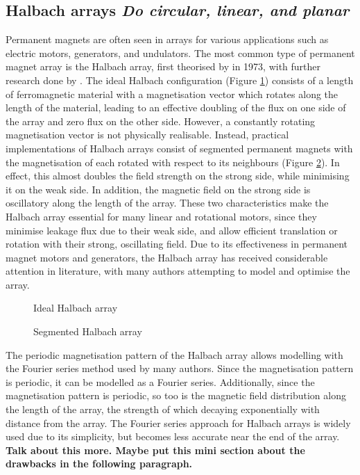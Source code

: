 \subsection{Halbach arrays \textit{Do circular, linear, and planar}}
Permanent magnets are often seen in arrays for various applications such as electric motors, generators, and undulators. The most common type of permanent magnet array is the Halbach array, first theorised by \textcite{Mallinson1973} in 1973, with further research done by \textcite{Halbach1980}. The ideal Halbach configuration (Figure \ref{fig:idealHalbachArray}) consists of a length of ferromagnetic material with a magnetisation vector which rotates along the length of the material, leading to an effective doubling of the flux on one side of the array and zero flux on the other side. However, a constantly rotating magnetisation vector is not physically realisable. Instead, practical implementations of Halbach arrays consist of segmented permanent magnets with the magnetisation of each rotated with respect to its neighbours (Figure \ref{fig:segmentedHalbachArray}). In effect, this almost doubles the field strength on the strong side, while minimising it on the weak side. In addition, the magnetic field on the strong side is oscillatory along the length of the array. These two characteristics make the Halbach array essential for many linear and rotational motors, since they minimise leakage flux due to their weak side, and allow efficient translation or rotation with their strong, oscillating field. Due to its effectiveness in permanent magnet motors and generators, the Halbach array has received considerable attention in literature, with many authors attempting to model and optimise the array.
\begin{figure}
    \centering
    \vspace{5cm}
    \caption{Ideal Halbach array}
    \label{fig:idealHalbachArray}
\end{figure}
\begin{figure}
    \centering
    \vspace{5cm}
    \caption{Segmented Halbach array}
    \label{fig:segmentedHalbachArray}
\end{figure}

The periodic magnetisation pattern of the Halbach array allows modelling with the Fourier series method used by many authors. Since the magnetisation pattern is periodic, it can be modelled as a Fourier series. Additionally, since the magnetisation pattern is periodic, so too is the magnetic field distribution along the length of the array, the strength of which decaying exponentially with distance from the array. The Fourier series approach for Halbach arrays is widely used due to its simplicity, but becomes less accurate near the end of the array. \textbf{Talk about this more. Maybe put this mini section about the drawbacks in the following paragraph.}

